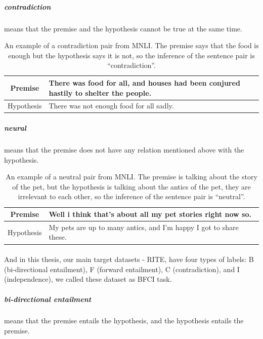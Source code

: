 \documentclass[12pt]{article}
\begin{document}
\begin{CJK*}{UTF8}{bkai}
\begin{spacing}{1.77}
\subparagraph{contradiction} means that the premise and the hypothesis cannot be true at the same time.

\begin{table}[ht!]
  \centering
  \begin{tabular}{|c|l|}
    \hline
    Premise & There was food for all, and houses had been conjured hastily to shelter the people. \\ \hline
    Hypothesis & There was not enough food for all sadly. \\ \hline
  \end{tabular}
  \caption[An example of a contradiction pair from MNLI]{An example of a contradiction pair from MNLI. The premise says that the food is enough but the hypothesis says it is not, so the inference of the sentence pair is ``contradiction''.}
\end{table}

\subparagraph{neural} means that the premise does not have any relation mentioned above with the hypothesis.

\begin{table}[ht!]
  \centering
  \begin{tabular}{|c|l|}
    \hline
    Premise & Well i think that's about all my pet stories right now so. \\ \hline
    Hypothesis & My pets are up to many antics, and I'm happy I got to share these. \\ \hline
  \end{tabular}
  \caption[An example of a neutral pair from MNLI]{An example of a neutral pair from MNLI. The premise is talking about the story of the pet, but the hypothesis is talking about the antics of the pet, they are irrelevant to each other, so the inference of the sentence pair is ``neutral''.}
\end{table}

\paragraph{}
And in this thesis, our main target datasets - RITE, have four types of labels: B (bi-directional entailment), F (forward entailment), C (contradiction), and I (independence), we called these dataset as BFCI task.

\subparagraph{bi-directional entailment} means that the premise entails the hypothesis, and the hypothesis entails the premise.


\end{spacing}
\end{CJK*}
\end{document}
